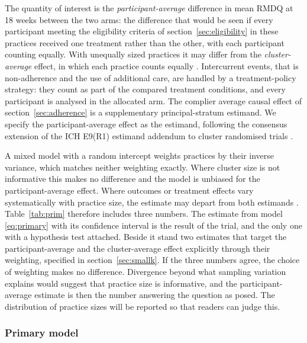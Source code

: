\documentclass[11pt,a4paper]{article}
\begin{document}
The quantity of interest is the \emph{participant-average} difference in mean
RMDQ at 18 weeks between the two arms: the difference that would be seen if
every participant meeting the eligibility criteria of
section~\ref{sec:eligibility} in these practices received one treatment rather
than the other, with each participant counting equally. With unequally sized practices it may differ from the
\emph{cluster-average} effect, in which each practice counts equally
\citep{kahan2023}. Intercurrent events, that is non-adherence and the use
of additional care, are handled by a treatment-policy strategy: they count
as part of the compared treatment conditions, and every participant is analysed
in the allocated arm. The complier average causal effect of
section~\ref{sec:adherence} is a supplementary principal-stratum estimand.
We specify the participant-average effect as the estimand, following the
consensus extension of the ICH E9(R1) estimand addendum \citep{ich2019} to
cluster randomised trials \citep{kahan2026}.

A mixed model with a random intercept
weights practices by their inverse variance, which matches neither weighting
exactly. Where cluster size is not informative this makes no difference and
the model is unbiased for the participant-average effect. Where outcomes or
treatment effects vary systematically with practice size, the estimate may
depart from both estimands \citep{kahan2023}. Table~\ref{tab:prim} therefore includes three numbers. The
estimate from model \eqref{eq:primary} with its confidence interval is the
result of the trial, and the only one with a hypothesis test attached.
Beside it stand two estimates that target the participant-average and the
cluster-average effect explicitly through their weighting, specified in
section~\ref{sec:smallk}. If the three numbers agree, the choice of weighting makes no difference.
Divergence beyond what sampling variation explains would suggest that
practice size is informative, and the participant-average estimate is then
the number answering the question as posed.
The distribution of practice sizes will be reported so that readers can judge
this.

\subsubsection{Primary model}
\end{document}
